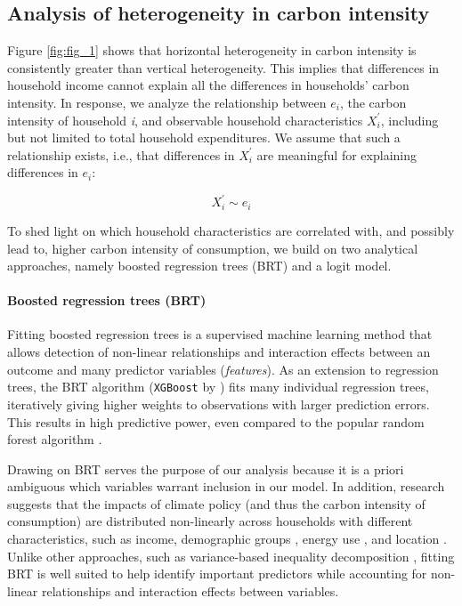 \documentclass[12pt, a4paper]{article}
\begin{document}
\subsection{Analysis of heterogeneity in carbon intensity} \label{sec:methods}

Figure \ref{fig:fig_1} shows that horizontal heterogeneity in carbon intensity is consistently greater than vertical heterogeneity. This implies that differences in household income cannot explain all the differences in households' carbon intensity. In response, we analyze the relationship between $e_{i}$, the carbon intensity of household \textit{i}, and observable household characteristics $X_{i}^{'}$, including but not limited to total household expenditures. We assume that such a relationship exists, i.e., that differences in $X_{i}^{'}$ are meaningful for explaining differences in $e_{i}$:

\begin{equation} \label{eq:relationship}
    X_{i}^{'} \sim e_{i} 
\end{equation}


To shed light on which household characteristics are correlated with, and possibly lead to, higher carbon intensity of consumption, we build on two analytical approaches, namely boosted regression trees (BRT) and a logit model.

\paragraph{Boosted regression trees (BRT)} Fitting boosted regression trees \autocite{Friedman.2003, Elith.2008} is a supervised machine learning method that allows detection of non-linear relationships and interaction effects between an outcome and many predictor variables (\textit{features}). As an extension to regression trees, the BRT algorithm (\texttt{XGBoost} by \textcite{Chen.2016}) fits many individual regression trees, iteratively giving higher weights to observations with larger prediction errors. This results in high predictive power, even compared to the popular random forest algorithm \autocite[e.g.,][]{Bentejac.2021}.

Drawing on BRT serves the purpose of our analysis because it is a priori ambiguous which variables warrant inclusion in our model. In addition, research suggests that the impacts of climate policy (and thus the carbon intensity of consumption) are distributed non-linearly across households with different characteristics, such as income, demographic groups \autocite{Missbach.2023}, energy use \autocite{Farrell.2017}, and location \autocite{Chan.2023}. Unlike other approaches, such as variance-based inequality decomposition \autocite{Farrell.2017,Sager.2019,Missbach.2024}, fitting BRT is well suited to help identify important predictors while accounting for non-linear relationships and interaction effects between variables.
\end{document}
